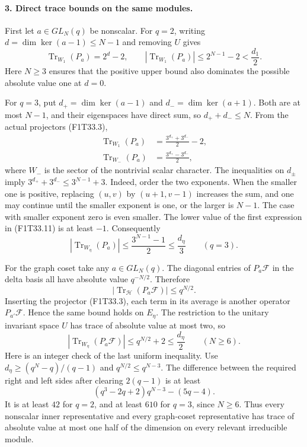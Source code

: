 \paragraph{3. Direct trace bounds on the same modules.}
First let \(a\in GL_N(q)\) be nonscalar.
For \(q=2\), writing \(d=\dim\ker(a-1)\le N-1\)
and removing \(U\) gives
\[
 \operatorname{Tr}_{W_1}(P_a)=2^d-2,
 \qquad
 |\operatorname{Tr}_{W_1}(P_a)|
 \le2^{N-1}-2<\frac{d_1}{2}.
 \tag{F1T33.10}
\]
Here \(N\ge3\) ensures that the positive upper bound
also dominates the possible absolute value one at
\(d=0\).

For \(q=3\), put
\(d_+=\dim\ker(a-1)\) and
\(d_-=\dim\ker(a+1)\). Both are at most \(N-1\),
and their eigenspaces have direct sum, so
\(d_++d_-\le N\). From the actual projectors
(F1T33.3),
\[
 \begin{aligned}
 \operatorname{Tr}_{W_1}(P_a)
     &=\frac{3^{d_+}+3^{d_-}}2-2,\\
 \operatorname{Tr}_{W_{-}}(P_a)
     &=\frac{3^{d_+}-3^{d_-}}2,
 \end{aligned}
 \tag{F1T33.11}
\]
where \(W_-\) is the sector of the nontrivial scalar
character. The inequalities on \(d_\pm\) imply
\(3^{d_+}+3^{d_-}\le3^{N-1}+3\).
Indeed, order the two exponents. When the smaller one
is positive, replacing \((u,v)\) by \((u+1,v-1)\)
increases the sum, and one may continue until the
smaller exponent is one, or the larger is \(N-1\).
The case with smaller exponent zero is even smaller.
The lower value of the first expression in
(F1T33.11) is at least \(-1\). Consequently
\[
 |\operatorname{Tr}_{W_\eta}(P_a)|
 \le\frac{3^{N-1}-1}{2}
 \le\frac{d_\eta}{3}
       \qquad(q=3).
 \tag{F1T33.12}
\]

For the graph coset take any \(a\in GL_N(q)\).
The diagonal entries of \(P_a\mathcal F\) in the
delta basis all have absolute value \(q^{-N/2}\).
Therefore
\[
 |\operatorname{Tr}_{\mathcal H}(P_a\mathcal F)|
       \le q^{N/2}.
 \tag{F1T33.13}
\]
Inserting the projector (F1T33.3), each term in its
average is another operator \(P_{a'}\mathcal F\).
Hence the same bound holds on \(E_\eta\).
The restriction to the unitary invariant space \(U\)
has trace of absolute value at most two, so
\[
 |\operatorname{Tr}_{W_\eta}(P_a\mathcal F)|
       \le q^{N/2}+2\le\frac{d_\eta}{2}
                  \qquad(N\ge6).
 \tag{F1T33.14}
\]
Here is an integer check of the last uniform inequality.
Use \(d_\eta\ge(q^N-q)/(q-1)\) and
\(q^{N/2}\le q^{N-3}\). The difference between the
required right and left sides after clearing
\(2(q-1)\) is at least
\[
       (q^3-2q+2)q^{N-3}-(5q-4).
 \tag{F1T33.15}
\]
It is at least \(42\) for \(q=2\), and at least
\(610\) for \(q=3\), since \(N\ge6\).
Thus every nonscalar inner representative and every
graph-coset representative has trace of absolute
value at most one half of the dimension on every
relevant irreducible module.

